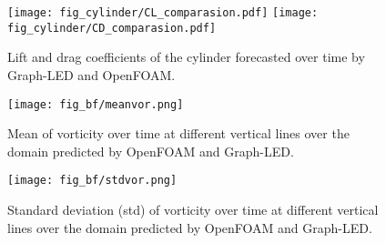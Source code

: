 \documentclass{article}
\begin{document}
\begin{figure}[htp]
    \centering
    \texttt{[image: fig\_cylinder/CL\_comparasion.pdf]}
    \texttt{[image: fig\_cylinder/CD\_comparasion.pdf]}
    \caption{Lift and drag coefficients of the cylinder forecasted over time by Graph-LED and OpenFOAM.}
    \label{fig:fpc-clcd}
\end{figure}





\begin{figure}[htp]
    \centering
    \texttt{[image: fig\_bf/meanvor.png]}
    \caption{Mean of vorticity over time at different vertical lines over the domain predicted by OpenFOAM and Graph-LED.}
    \label{fig:bf-mean}
\end{figure}
\begin{figure}[htp]
    \centering
    \texttt{[image: fig\_bf/stdvor.png]}
    \caption{Standard deviation (std) of vorticity over time at different vertical lines over the domain predicted by OpenFOAM and Graph-LED.}
    \label{fig:bf-std}
\end{figure}
\end{document}
